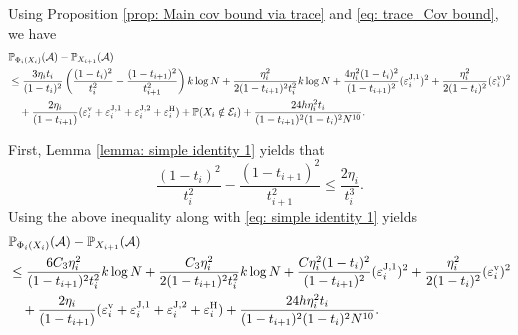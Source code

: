 \documentclass{article}
\theoremstyle{plain}
\theoremstyle{definition}
\theoremstyle{remark}
\def\bbE{\mathbb{E}}
\def\bbP{\mathbb{P}}
\def\cA{\mathcal{A}}
\def\cE{\mathcal{E}}
\def\Norm#1{\Vert#1\Vert}
\def\pr{{\bbP}}
\def\Cov{\text{Cov}}
\def\evel{\varepsilon^{\rm v}}
\def\evelJone{\varepsilon^{\rm J,1}}
\def\evelJtwo{\varepsilon^{\rm J,2}}
\def\evelH{\varepsilon^{\rm H}}
\DeclareMathOperator{\Tr}{Tr}
\begin{document}
Using Proposition \ref{prop: Main cov bound via trace} and \eqref{eq: trace_Cov bound}, we have
\begin{align*}
& \mathbb{P}_{\Phi_{i}\left(X_{i}\right)}(\mathcal{A})-\mathbb{P}_{X_{i+1}}(\mathcal{A}) \\
 & \le \frac{3 \eta_i t_i }{ (1-t_i)^2} \left(\frac{(1-t_i)^2}{t_i^2} - \frac{(1-t_{i+1})^2}{t_{i+1}^2}\right) k \log N + \frac{\eta_i^2}{2(1-t_{i+1})^2 t_i^2} k \log N + \frac{4 \eta_i^2 (1-t_i)^2}{(1-t_{i+1})^2} (\evelJone_i)^{2} + \frac{\eta_i^2}{2(1-t_i)^2}(\evel_i)^2\\
  &\quad  + \frac{2 \eta_i }{(1-t_{i+1})}( \evel_i + \evelJone_i + \evelJtwo_i + \evelH_i) + \pr(X_i \notin \cE_i) + \frac{24 h \eta_i^2 t_i}{(1-t_{i+1})^2(1-t_i)^2 N^{10}}.
\end{align*}

First, Lemma \ref{lemma: simple identity 1} yields that 
\begin{equation}
\label{eq: simple identity 1}
\frac{(1-t_i)^2}{t_i^2} - \frac{(1-t_{i+1})^2}{t_{i+1}^2} \le \frac{2 \eta_i}{t_i^3}.
\end{equation}
Using the above inequality along with \eqref{eq: simple identity 1} yields 
\begin{align*}
  & \mathbb{P}_{\Phi_{i}\left(X_{i}\right)}(\mathcal{A})-\mathbb{P}_{X_{i+1}}(\mathcal{A}) \\
&  \le \frac{6 C_3 \eta_i^2}{(1-t_{i+1})^2 t_i^2} k \log N + \frac{C_3 \eta_i^2}{2(1-t_{i+1})^2 t_i^2} k \log N + \frac{C \eta_i^2 (1-t_i)^2}{(1-t_{i+1})^2} (\evelJone_i)^{2} + \frac{\eta_i^2}{2(1-t_i)^2}(\evel_i)^2\\
  &\quad  + \frac{2 \eta_i }{(1-t_{i+1})}( \evel_i + \evelJone_i + \evelJtwo_i + \evelH_i) + \frac{24 h \eta_i^2 t_i}{(1-t_{i+1})^2(1-t_i)^2 N^{10}} .
\end{align*}
\end{document}
